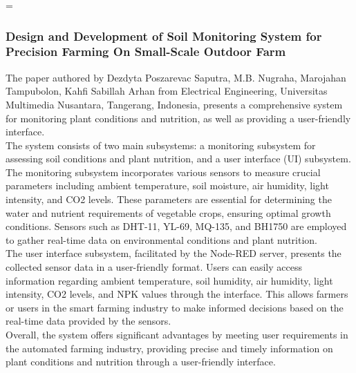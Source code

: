 =\documentclass[12pt, a4paper]{article}
\begin{document}
\subsubsection{Design and Development of Soil Monitoring System for Precision Farming On Small-Scale Outdoor Farm}
The paper authored by Dezdyta Poszarevac Saputra, M.B. Nugraha, Marojahan Tampubolon, Kahfi Sabillah Arhan \cite{10435334} from Electrical Engineering, Universitas Multimedia Nusantara, Tangerang, Indonesia, presents a comprehensive system for monitoring plant conditions and nutrition, as well as providing a user-friendly interface.\\
The system consists of two main subsystems: a monitoring subsystem for assessing soil conditions and plant nutrition, and a user interface (UI) subsystem.\\
The monitoring subsystem incorporates various sensors to measure crucial parameters including ambient temperature, soil moisture, air humidity, light intensity, and CO2 levels. These parameters are essential for determining the water and nutrient requirements of vegetable crops, ensuring optimal growth conditions. Sensors such as DHT-11, YL-69, MQ-135, and BH1750 are employed to gather real-time data on environmental conditions and plant nutrition.\\
The user interface subsystem, facilitated by the Node-RED server, presents the collected sensor data in a user-friendly format. Users can easily access information regarding ambient temperature, soil humidity, air humidity, light intensity, CO2 levels, and NPK values through the interface. This allows farmers or users in the smart farming industry to make informed decisions based on the real-time data provided by the sensors.\\
Overall, the system offers significant advantages by meeting user requirements in the automated farming industry, providing precise and timely information on plant conditions and nutrition through a user-friendly interface.
\end{document}
